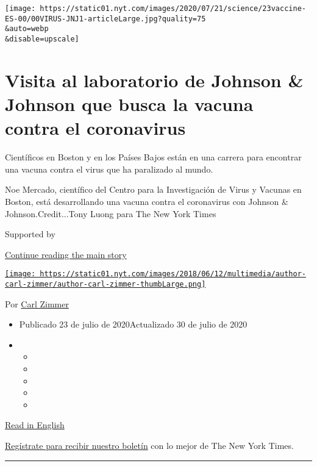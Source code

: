 \texttt{[image: https://static01.nyt.com/images/2020/07/21/science/23vaccine-ES-00/00VIRUS-JNJ1-articleLarge.jpg?quality=75\\\&auto=webp\\\&disable=upscale]}

\hypertarget{visita-al-laboratorio-de-johnson--johnson-que-busca-la-vacuna-contra-el-coronavirus}{%
\section{Visita al laboratorio de Johnson \& Johnson que busca la vacuna
contra el
coronavirus}\label{visita-al-laboratorio-de-johnson--johnson-que-busca-la-vacuna-contra-el-coronavirus}}

Científicos en Boston y en los Países Bajos están en una carrera para
encontrar una vacuna contra el virus que ha paralizado al mundo.

Noe Mercado, científico del Centro para la Investigación de Virus y
Vacunas en Boston, está desarrollando una vacuna contra el coronavirus
con Johnson \& Johnson.Credit...Tony Luong para The New York Times

Supported by

\protect\hyperlink{after-sponsor}{Continue reading the main story}

\href{https://www.nytimes.com/by/carl-zimmer}{\texttt{[image: https://static01.nyt.com/images/2018/06/12/multimedia/author-carl-zimmer/author-carl-zimmer-thumbLarge.png]}}

Por \href{https://www.nytimes.com/by/carl-zimmer}{Carl Zimmer}

\begin{itemize}
\item
  Publicado 23 de julio de 2020Actualizado 30 de julio de 2020
\item
  \begin{itemize}
  \item
  \item
  \item
  \item
  \item
  \end{itemize}
\end{itemize}

\href{https://www.nytimes.com/2020/07/17/health/coronavirus-vaccine-johnson-janssen.html}{Read
in English}

\href{https://www.nytimes.com/newsletters/el-times}{Regístrate para
recibir nuestro boletín} con lo mejor de The New York Times.

\begin{center}\rule{0.5\linewidth}{\linethickness}\end{center}

